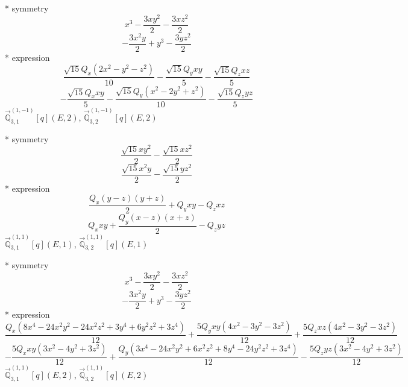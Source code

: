 \documentclass[fleqn,8pt]{jsarticle}
\begin{document}
\noindent\quad ** symmetry
\begin{dmath*}
x^{3} - \frac{3 x y^{2}}{2} - \frac{3 x z^{2}}{2}
\end{dmath*}
\begin{dmath*}
- \frac{3 x^{2} y}{2} + y^{3} - \frac{3 y z^{2}}{2}
\end{dmath*}
\noindent\quad ** expression
\begin{dmath*}
\frac{\sqrt{15} Q_{x} \left(2 x^{2} - y^{2} - z^{2}\right)}{10} - \frac{\sqrt{15} Q_{y} x y}{5} - \frac{\sqrt{15} Q_{z} x z}{5}
\end{dmath*}
\begin{dmath*}
- \frac{\sqrt{15} Q_{x} x y}{5} - \frac{\sqrt{15} Q_{y} \left(x^{2} - 2 y^{2} + z^{2}\right)}{10} - \frac{\sqrt{15} Q_{z} y z}{5}
\end{dmath*}
\noindent\quad $\vec{\mathbb{Q}}_{3,1}^{(1,-1)}[q](E,2)$, $\vec{\mathbb{Q}}_{3,2}^{(1,-1)}[q](E,2)$

\noindent\quad ** symmetry
\begin{dmath*}
\frac{\sqrt{15} x y^{2}}{2} - \frac{\sqrt{15} x z^{2}}{2}
\end{dmath*}
\begin{dmath*}
\frac{\sqrt{15} x^{2} y}{2} - \frac{\sqrt{15} y z^{2}}{2}
\end{dmath*}
\noindent\quad ** expression
\begin{dmath*}
\frac{Q_{x} \left(y - z\right) \left(y + z\right)}{2} + Q_{y} x y - Q_{z} x z
\end{dmath*}
\begin{dmath*}
Q_{x} x y + \frac{Q_{y} \left(x - z\right) \left(x + z\right)}{2} - Q_{z} y z
\end{dmath*}
\noindent\quad $\vec{\mathbb{Q}}_{3,1}^{(1,1)}[q](E,1)$, $\vec{\mathbb{Q}}_{3,2}^{(1,1)}[q](E,1)$

\noindent\quad ** symmetry
\begin{dmath*}
x^{3} - \frac{3 x y^{2}}{2} - \frac{3 x z^{2}}{2}
\end{dmath*}
\begin{dmath*}
- \frac{3 x^{2} y}{2} + y^{3} - \frac{3 y z^{2}}{2}
\end{dmath*}
\noindent\quad ** expression
\begin{dmath*}
\frac{Q_{x} \left(8 x^{4} - 24 x^{2} y^{2} - 24 x^{2} z^{2} + 3 y^{4} + 6 y^{2} z^{2} + 3 z^{4}\right)}{12} + \frac{5 Q_{y} x y \left(4 x^{2} - 3 y^{2} - 3 z^{2}\right)}{12} + \frac{5 Q_{z} x z \left(4 x^{2} - 3 y^{2} - 3 z^{2}\right)}{12}
\end{dmath*}
\begin{dmath*}
- \frac{5 Q_{x} x y \left(3 x^{2} - 4 y^{2} + 3 z^{2}\right)}{12} + \frac{Q_{y} \left(3 x^{4} - 24 x^{2} y^{2} + 6 x^{2} z^{2} + 8 y^{4} - 24 y^{2} z^{2} + 3 z^{4}\right)}{12} - \frac{5 Q_{z} y z \left(3 x^{2} - 4 y^{2} + 3 z^{2}\right)}{12}
\end{dmath*}
\noindent\quad $\vec{\mathbb{Q}}_{3,1}^{(1,1)}[q](E,2)$, $\vec{\mathbb{Q}}_{3,2}^{(1,1)}[q](E,2)$
\end{document}
